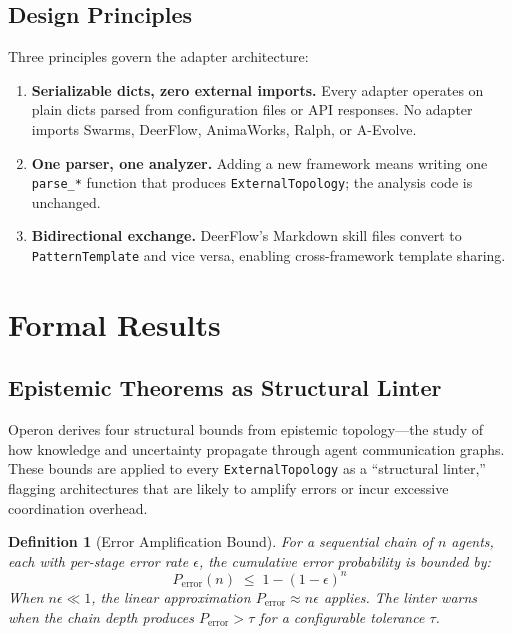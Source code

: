 \documentclass[11pt]{article}
\newtheorem{definition}{Definition}
\begin{document}
\subsection{Design Principles}

Three principles govern the adapter architecture:

\begin{enumerate}[leftmargin=*,itemsep=2pt]
  \item \textbf{Serializable dicts, zero external imports.}  Every adapter
    operates on plain dicts parsed from configuration files or API
    responses.  No adapter imports Swarms, DeerFlow, AnimaWorks, Ralph, or
    A-Evolve.
  \item \textbf{One parser, one analyzer.}  Adding a new framework means
    writing one \texttt{parse\_*} function that produces
    \texttt{ExternalTopology}; the analysis code is unchanged.
  \item \textbf{Bidirectional exchange.}  DeerFlow's Markdown skill files
    convert to \texttt{PatternTemplate} and vice versa, enabling
    cross-framework template sharing.
\end{enumerate}

\section{Formal Results}\label{sec:formal}

\subsection{Epistemic Theorems as Structural Linter}\label{sec:epistemic}

Operon derives four structural bounds from epistemic topology---the
study of how knowledge and uncertainty propagate through agent
communication graphs.  These bounds are applied to every
\texttt{ExternalTopology} as a ``structural linter,'' flagging
architectures that are likely to amplify errors or incur excessive
coordination overhead.

\begin{definition}[Error Amplification Bound]
For a sequential chain of $n$ agents, each with per-stage error rate
$\epsilon$, the cumulative error probability is bounded by:
\[
  P_{\mathrm{error}}(n) \;\leq\; 1 - (1 - \epsilon)^n
\]
When $n\epsilon \ll 1$, the linear approximation $P_{\mathrm{error}} \approx n\epsilon$
applies.  The linter warns when the chain depth produces
$P_{\mathrm{error}} > \tau$ for a configurable tolerance $\tau$.
\end{definition}
\end{document}
